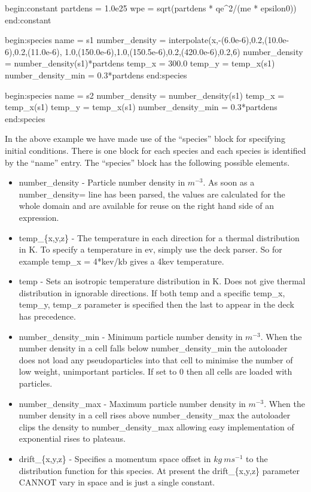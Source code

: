 \documentclass[12pt,a4paper]{article}
\newenvironment{nbboxverbatim}[1]{
\noindent\minipage{\textwidth}
\setlength{\FrameSep}{0pt}
\def\FrameCommand{\fboxsep=0pt \colorbox{shadecolor}}
\MakeFramed{\FrameRestore}
\fvset{label=#1}
\boxverb
}{
\endboxverb
\vspace{-13.5pt}
\endMakeFramed
\endminipage
\vspace{5pt}
}
\begin{document}
\begin{nbboxverbatim}{none}
begin:constant
   partdens = 1.0e25
   wpe = sqrt(partdens * qe^2/(me * epsilon0))
end:constant

begin:species
   name = s1
   number_density = interpolate(x,-(6.0e-6),0.2,(10.0e-6),0.2,(11.0e-6),
            1.0,(150.0e-6),1.0,(150.5e-6),0.2,(420.0e-6),0.2,6)
   number_density = number_density(s1)*partdens
   temp_x = 300.0
   temp_y = temp_x(s1)
   number_density_min = 0.3*partdens
end:species

begin:species
   name = s2
   number_density = number_density(s1)
   temp_x = temp_x(s1)
   temp_y = temp_x(s1)
   number_density_min = 0.3*partdens
end:species
\end{nbboxverbatim}

In the above example we have made use of the ``species'' block for specifying
initial conditions. There is one block for each species
and each species is identified by the ``name'' entry.
The ``species'' block has the following possible elements.
\begin{itemize}
\item number\_density - Particle number density in $m^{-3}$. 
  As soon as a number\_density= line has been parsed, the values are
  calculated for the whole domain and are available for reuse on the right hand
  side of an expression.
\item temp\_\{x,y,z\} - The temperature in each direction for a thermal
  distribution in K. To specify a temperature in ev, simply use the deck
  parser. So for example temp\_x = 4*kev/kb gives a 4kev temperature.
\item temp - Sets an isotropic temperature distribution in K. Does not give
  thermal distribution in ignorable directions. If both temp and a specific
  temp\_x, temp\_y, temp\_z parameter is specified then the last to appear in
  the deck has precedence.
\item number\_density\_min - Minimum particle number density in $m^{-3}$.
  When the number density in a cell falls below number\_density\_min the
  autoloader does not load any
  pseudoparticles into that cell to minimise the number of low weight,
  unimportant particles. If set to 0 then all cells are loaded with particles.
\item number\_density\_max - Maximum particle number density in $m^{-3}$. When
  the number density in a cell rises above number\_density\_max the autoloader
  clips the density to number\_density\_max allowing easy implementation of
  exponential rises to plateaus.
\item drift\_\{x,y,z\} - Specifies a momentum space offset in $kg\ ms^{-1}$ to
  the distribution function for this species. At present the drift\_\{x,y,z\}
  parameter CANNOT vary in space and is just a single constant.
\end{itemize}
\end{document}
